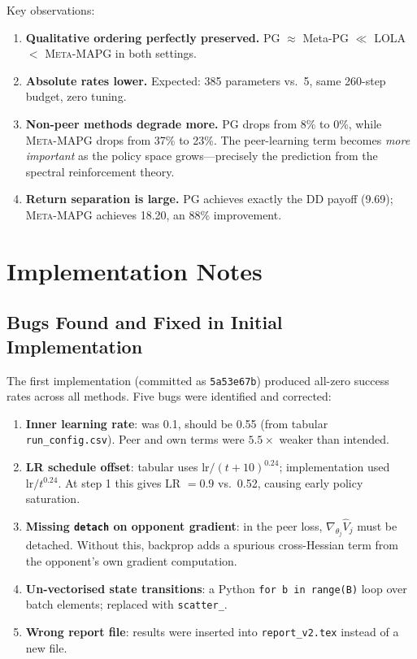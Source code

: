 \documentclass[11pt,a4paper]{article}
\newcommand{\MAPG}{\textsc{Meta-MAPG}}
\begin{document}
Key observations:
\begin{enumerate}[nosep]
  \item \textbf{Qualitative ordering perfectly preserved.} PG $\approx$ Meta-PG $\ll$ LOLA $<$ \MAPG{} in both settings.
  \item \textbf{Absolute rates lower.} Expected: 385 parameters vs.\ 5, same 260-step budget, zero tuning.
  \item \textbf{Non-peer methods degrade more.} PG drops from 8\% to 0\%, while \MAPG{} drops from 37\% to 23\%. The peer-learning term becomes \emph{more important} as the policy space grows---precisely the prediction from the spectral reinforcement theory.
  \item \textbf{Return separation is large.} PG achieves exactly the DD payoff (9.69); \MAPG{} achieves 18.20, an 88\% improvement.
\end{enumerate}

\section{Implementation Notes}

\subsection{Bugs Found and Fixed in Initial Implementation}

The first implementation (committed as \texttt{5a53e67b}) produced all-zero success rates across all methods. Five bugs were identified and corrected:

\begin{enumerate}[nosep]
  \item \textbf{Inner learning rate}: was 0.1, should be 0.55 (from tabular \texttt{run\_config.csv}). Peer and own terms were $5.5\times$ weaker than intended.
  \item \textbf{LR schedule offset}: tabular uses $\text{lr} / (t + 10)^{0.24}$; implementation used $\text{lr} / t^{0.24}$. At step 1 this gives LR $= 0.9$ vs.\ 0.52, causing early policy saturation.
  \item \textbf{Missing \texttt{detach} on opponent gradient}: in the peer loss, $\nabla_{\theta_j}\hat{V}_j$ must be detached. Without this, backprop adds a spurious cross-Hessian term from the opponent's own gradient computation.
  \item \textbf{Un-vectorised state transitions}: a Python \texttt{for b in range(B)} loop over batch elements; replaced with \texttt{scatter\_}.
  \item \textbf{Wrong report file}: results were inserted into \texttt{report\_v2.tex} instead of a new file.
\end{enumerate}
\end{document}
